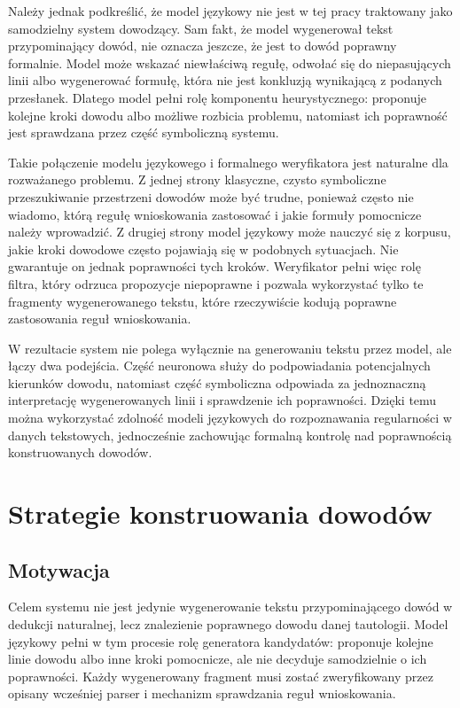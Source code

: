 \documentclass[shortabstract]{iithesis}
\theoremstyle{definition}
\theoremstyle{remark}
\theoremstyle{plain}
\begin{document}
Należy jednak podkreślić, że model językowy nie jest w tej pracy traktowany jako
samodzielny system dowodzący. Sam fakt, że model wygenerował tekst przypominający
dowód, nie oznacza jeszcze, że jest to dowód poprawny formalnie. Model może
wskazać niewłaściwą regułę, odwołać się do niepasujących linii albo wygenerować
formułę, która nie jest konkluzją wynikającą z podanych przesłanek. Dlatego model
pełni rolę komponentu heurystycznego: proponuje kolejne kroki dowodu albo możliwe
rozbicia problemu, natomiast ich poprawność jest sprawdzana przez część symboliczną
systemu.

Takie połączenie modelu językowego i formalnego weryfikatora jest naturalne dla
rozważanego problemu. Z jednej strony klasyczne, czysto symboliczne przeszukiwanie
przestrzeni dowodów może być trudne, ponieważ często nie wiadomo, którą regułę
wnioskowania zastosować i jakie formuły pomocnicze należy wprowadzić. Z drugiej
strony model językowy może nauczyć się z korpusu, jakie kroki dowodowe często
pojawiają się w podobnych sytuacjach. Nie gwarantuje on jednak poprawności tych
kroków. Weryfikator pełni więc rolę filtra, który odrzuca propozycje niepoprawne
i pozwala wykorzystać tylko te fragmenty wygenerowanego tekstu, które rzeczywiście
kodują poprawne zastosowania reguł wnioskowania.

W rezultacie system nie polega wyłącznie na generowaniu tekstu przez model, ale
łączy dwa podejścia. Część neuronowa służy do podpowiadania potencjalnych kierunków
dowodu, natomiast część symboliczna odpowiada za jednoznaczną interpretację
wygenerowanych linii i sprawdzenie ich poprawności. Dzięki temu można wykorzystać
zdolność modeli językowych do rozpoznawania regularności w danych tekstowych,
jednocześnie zachowując formalną kontrolę nad poprawnością konstruowanych dowodów.






\chapter{Strategie konstruowania dowodów}

\section{Motywacja}
Celem systemu nie jest jedynie wygenerowanie tekstu przypominającego dowód
w dedukcji naturalnej, lecz znalezienie poprawnego dowodu danej tautologii.
Model językowy pełni w tym procesie rolę generatora kandydatów: proponuje kolejne
linie dowodu albo inne kroki pomocnicze, ale nie decyduje samodzielnie o ich
poprawności. Każdy wygenerowany fragment musi zostać zweryfikowany przez opisany
wcześniej parser i mechanizm sprawdzania reguł wnioskowania.
\end{document}
